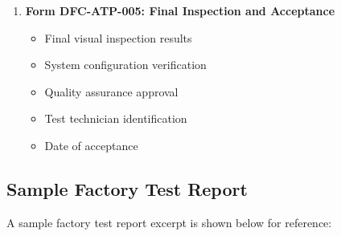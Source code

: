 \documentclass[12pt,a4paper,twoside,openright]{book}
\begin{document}
\begin{enumerate}
    \item \textbf{Form DFC-ATP-005: Final Inspection and Acceptance}
    \begin{itemize}
        \item Final visual inspection results
        \item System configuration verification
        \item Quality assurance approval
        \item Test technician identification
        \item Date of acceptance
    \end{itemize}
\end{enumerate}

\subsection{Sample Factory Test Report}

A sample factory test report excerpt is shown below for reference:
\end{document}
